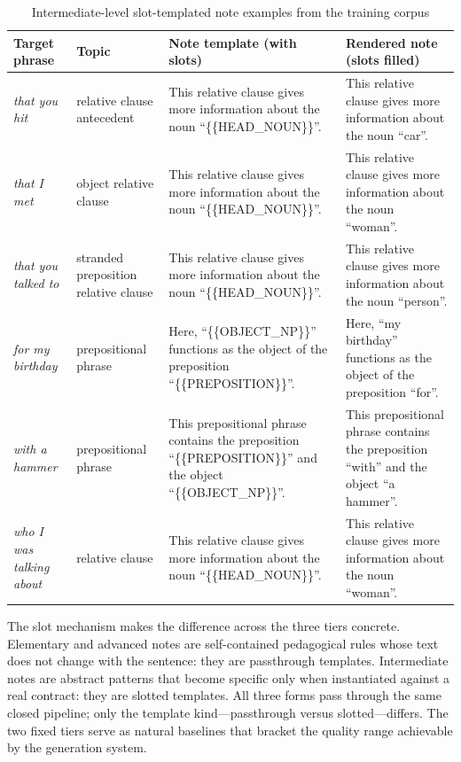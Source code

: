 \documentclass[12pt,a4paper,oneside]{report}
\begin{document}
\begin{table}[H]
  \centering
  \caption{Intermediate-level slot-templated note examples from the training corpus}
  \label{tab:inter-examples}
  \begin{tabularx}{\textwidth}{p{3.2cm}p{2.6cm}p{3.8cm}X}
    \toprule
    \textbf{Target phrase} & \textbf{Topic} & \textbf{Note template (with slots)} & \textbf{Rendered note (slots filled)} \\
    \midrule
    \emph{that you hit} & relative clause antecedent &
      This relative clause gives more information about the noun ``\{\{HEAD\_NOUN\}\}''. &
      This relative clause gives more information about the noun ``car''. \\
    \midrule
    \emph{that I met} & object relative clause &
      This relative clause gives more information about the noun ``\{\{HEAD\_NOUN\}\}''. &
      This relative clause gives more information about the noun ``woman''. \\
    \midrule
    \emph{that you talked to} & stranded preposition relative clause &
      This relative clause gives more information about the noun ``\{\{HEAD\_NOUN\}\}''. &
      This relative clause gives more information about the noun ``person''. \\
    \midrule
    \emph{for my birthday} & prepositional phrase &
      Here, ``\{\{OBJECT\_NP\}\}'' functions as the object of the preposition ``\{\{PREPOSITION\}\}''. &
      Here, ``my birthday'' functions as the object of the preposition ``for''. \\
    \midrule
    \emph{with a hammer} & prepositional phrase &
      This prepositional phrase contains the preposition ``\{\{PREPOSITION\}\}'' and the object ``\{\{OBJECT\_NP\}\}''. &
      This prepositional phrase contains the preposition ``with'' and the object ``a hammer''. \\
    \midrule
    \emph{who I was talking about} & relative clause &
      This relative clause gives more information about the noun ``\{\{HEAD\_NOUN\}\}''. &
      This relative clause gives more information about the noun ``woman''. \\
    \bottomrule
  \end{tabularx}
\end{table}

The slot mechanism makes the difference across the three tiers concrete. Elementary and advanced notes are self-contained pedagogical rules whose text does not change with the sentence: they are passthrough templates. Intermediate notes are abstract patterns that become specific only when instantiated against a real contract: they are slotted templates. All three forms pass through the same closed pipeline; only the template kind---passthrough versus slotted---differs. The two fixed tiers serve as natural baselines that bracket the quality range achievable by the generation system.
\end{document}
